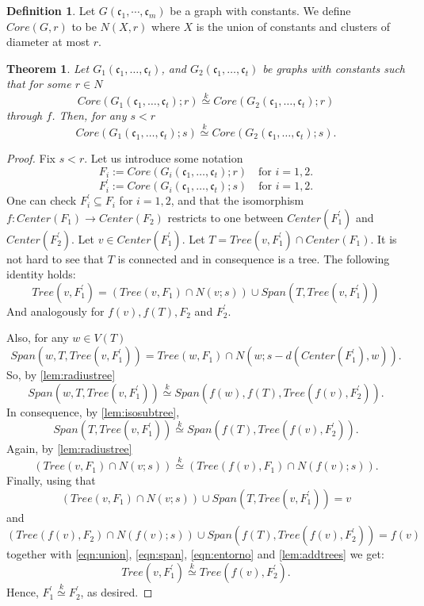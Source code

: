 \documentclass[11pt,notitlepage,a4paper]{article}
\newtheorem{theorem}{Theorem}[section]
\theoremstyle{definition}
\newtheorem{definition}{Definition}[section]
\newcommand{\cc}{\mathfrak{c}}
\newcommand{\clist}{\mathfrak{c}_{1}, \cdots, \mathfrak{c}_m}
\newcommand{\morph}[1]{\stackrel{#1}{\simeq}}
\begin{document}
\begin{definition} 
	Let $G(\clist)$ be a graph with constants. We define $Core(G,r)$ to be
	$N(X,r)$ where $X$ is the union of constants and clusters of diameter at most $r$. 
\end{definition}

\begin{theorem} \label{thm:lessradius}
	Let $G_1(\cc_1,\dots, \cc_t)$, and $G_2(\cc_1,\dots,\cc_t)$ be graphs
	with constants such that for some $r\in N$
	\[ Core(G_1(\cc_1,\dots, \cc_t);r)\morph{k} Core(G_2(\cc_1,\dots, \cc_t);r)\]
	through $f$. 
	Then, for any $s<r$
	\[ Core(G_1(\cc_1,\dots, \cc_t);s)\morph{k} Core(G_2(\cc_1,\dots, \cc_t);s).\]
\end{theorem}
\begin{proof}
	Fix $s<r$. Let us introduce some notation
	\[ F_i:= Core(G_i(\cc_1,\dots, \cc_t);r) \quad \text{for }i=1,2.\]
	\[ F^\prime_i:= Core(G_i(\cc_1,\dots, \cc_t);s) \quad \text{for }i=1,2.\]
	One can check $F^\prime_i\subseteq F_i$ for $i=1,2$, and that the isomorphism 
	$f:Center(F_1)\rightarrow Center(F_2)$ restricts to one between
	$Center(F^\prime_1)$ and $Center(F^\prime_2)$. Let $v\in Center(F^\prime_1)$.
	Let $T=Tree(v,F^\prime_1)\cap Center(F_1)$. It is not hard to see that $T$ is connected 
	and in consequence is a tree. The following identity holds:
	\begin{equation} \label{eqn:union}
	Tree(v,F^\prime_1)= (Tree(v,F_1)\cap N(v;s))
	\cup Span(T, Tree(v,F^\prime_1)) 
	\end{equation}
	And analogously for $f(v), f(T), F_2$ and $F^\prime_2$.\par
	Also, for any $w\in V(T)$
	\[Span(w,T, Tree(v,F^\prime_1)) =
	Tree(w,F_1)\cap N(w; s-d(Center(F^\prime_1),w)).\]
	So, by \cref{lem:radiustree}
	\[Span(w,T,Tree(v,F^\prime_1))\morph{k}
	Span(f(w),f(T),Tree(f(v),F^\prime_2)).\]
	In consequence, by \cref{lem:isosubtree},
	\begin{equation} \label{eqn:span}
	Span(T,Tree(v,F^\prime_1))\morph{k} Span(f(T),Tree(f(v),F^\prime_2)).
	\end{equation}
	Again, by \cref{lem:radiustree} 
	\begin{equation} \label{eqn:entorno}
	(Tree(v,F_1)\cap N(v;s))\morph{k}(Tree(f(v),F_1)\cap N(f(v);s)).
	\end{equation}
	Finally, using that
	\[(Tree(v,F_1)\cap N(v;s))\cup Span(T,Tree(v,F^\prime_1))=v\]
	and
	\[(Tree(f(v),F_2)\cap N(f(v);s))\cup Span(f(T),Tree(f(v),F^\prime_2))=f(v)\]
	together with \cref{eqn:union},
	\cref{eqn:span}, \cref{eqn:entorno} and \cref{lem:addtrees} we get:
	\[Tree(v,F^\prime_1)\morph{k} Tree(f(v),F^\prime_2) .\]
	Hence, $F^\prime_1\morph{k} F^\prime_2$, as desired. 
\end{proof}
\end{document}
